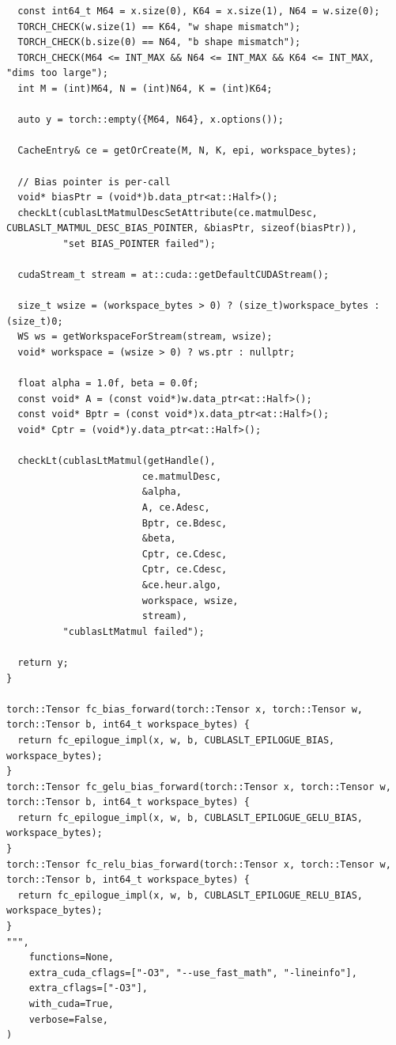 \begin{tcolorbox}[mybox, title={our model in Level 3 Task 44 — Reported 3.75 $\times$ Speedup}]
\begin{verbatim}
  const int64_t M64 = x.size(0), K64 = x.size(1), N64 = w.size(0);
  TORCH_CHECK(w.size(1) == K64, "w shape mismatch");
  TORCH_CHECK(b.size(0) == N64, "b shape mismatch");
  TORCH_CHECK(M64 <= INT_MAX && N64 <= INT_MAX && K64 <= INT_MAX, "dims too large");
  int M = (int)M64, N = (int)N64, K = (int)K64;

  auto y = torch::empty({M64, N64}, x.options());

  CacheEntry& ce = getOrCreate(M, N, K, epi, workspace_bytes);

  // Bias pointer is per-call
  void* biasPtr = (void*)b.data_ptr<at::Half>();
  checkLt(cublasLtMatmulDescSetAttribute(ce.matmulDesc, CUBLASLT_MATMUL_DESC_BIAS_POINTER, &biasPtr, sizeof(biasPtr)),
          "set BIAS_POINTER failed");

  cudaStream_t stream = at::cuda::getDefaultCUDAStream();

  size_t wsize = (workspace_bytes > 0) ? (size_t)workspace_bytes : (size_t)0;
  WS ws = getWorkspaceForStream(stream, wsize);
  void* workspace = (wsize > 0) ? ws.ptr : nullptr;

  float alpha = 1.0f, beta = 0.0f;
  const void* A = (const void*)w.data_ptr<at::Half>();
  const void* Bptr = (const void*)x.data_ptr<at::Half>();
  void* Cptr = (void*)y.data_ptr<at::Half>();

  checkLt(cublasLtMatmul(getHandle(),
                        ce.matmulDesc,
                        &alpha,
                        A, ce.Adesc,
                        Bptr, ce.Bdesc,
                        &beta,
                        Cptr, ce.Cdesc,
                        Cptr, ce.Cdesc,
                        &ce.heur.algo,
                        workspace, wsize,
                        stream),
          "cublasLtMatmul failed");

  return y;
}

torch::Tensor fc_bias_forward(torch::Tensor x, torch::Tensor w, torch::Tensor b, int64_t workspace_bytes) {
  return fc_epilogue_impl(x, w, b, CUBLASLT_EPILOGUE_BIAS, workspace_bytes);
}
torch::Tensor fc_gelu_bias_forward(torch::Tensor x, torch::Tensor w, torch::Tensor b, int64_t workspace_bytes) {
  return fc_epilogue_impl(x, w, b, CUBLASLT_EPILOGUE_GELU_BIAS, workspace_bytes);
}
torch::Tensor fc_relu_bias_forward(torch::Tensor x, torch::Tensor w, torch::Tensor b, int64_t workspace_bytes) {
  return fc_epilogue_impl(x, w, b, CUBLASLT_EPILOGUE_RELU_BIAS, workspace_bytes);
}
""",
    functions=None,
    extra_cuda_cflags=["-O3", "--use_fast_math", "-lineinfo"],
    extra_cflags=["-O3"],
    with_cuda=True,
    verbose=False,
)



\end{verbatim}
\end{tcolorbox}
